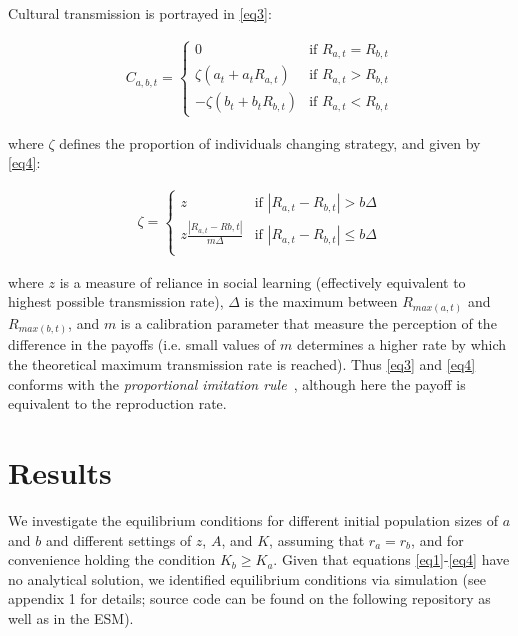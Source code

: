 \documentclass[preprint,authoryear]{elsarticle}
\begin{document}
Cultural transmission is portrayed in \eqref{eq3}:

\begin{align}
\label{eq3}
C_{a,b,t} = 
\begin{cases}
0& \text{if } R_{a,t} = R_{b,t}\\
\zeta(a_t+a_tR_{a,t})& \text{if } R_{a,t} > R_{b,t}\\
-\zeta(b_t+b_tR_{b,t})& \text{if } R_{a,t} < R_{b,t}
\end{cases}
\end{align}

where $\zeta$ defines the proportion of individuals changing strategy, and given by \eqref{eq4}:

\begin{align}
\label{eq4}
\zeta = 
\begin{cases}
z& \text{if }|R_{a,t}-R_{b,t}| > b\Delta\\
z\frac{|R_{a,t}-R{b,t}|}{m\Delta}& \text{if }|R_{a,t}-R_{b,t}| \leq b\Delta\\
\end{cases}
\end{align}

where $z$ is a measure of reliance in social learning (effectively equivalent to highest possible transmission rate), $\Delta$ is the maximum between $R_{max(a,t)}$ and $R_{max(b,t)}$, and $m$ is a calibration parameter that measure the perception of the difference in the payoffs (i.e. small values of $m$ determines a higher rate by which the theoretical maximum transmission rate is reached). Thus \eqref{eq3} and \eqref{eq4}  conforms with the \emph{proportional imitation rule}~\citep{schlag1998}, although here the payoff is equivalent to the reproduction rate. 

\section{Results}

We investigate the equilibrium conditions for different initial population sizes of  $a$ and $b$ and different settings of $z$, $A$, and $K$, assuming that  $r_a=r_b$, and for convenience holding the condition $K_b \geq K_a$. Given that equations \ref{eq1}-\ref{eq4} have no analytical solution, we identified equilibrium conditions via simulation (see appendix 1 for details; source code can be found on the following repository %
as well as in the ESM).  
\end{document}
